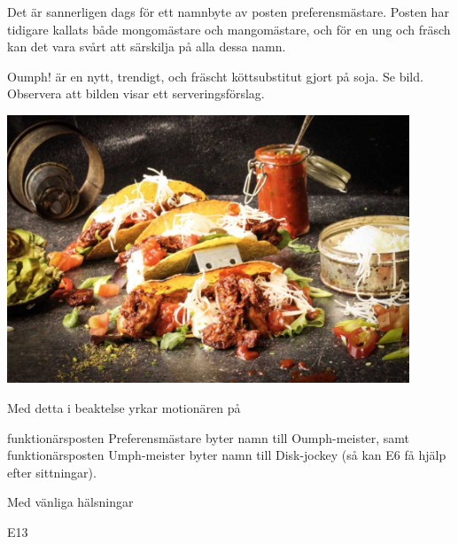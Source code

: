 \documentclass[../_main/handlingar.tex]{subfiles}
\begin{document}
Det är sannerligen dags för ett namnbyte av posten preferensmästare. Posten har tidigare kallats både mongomästare och mangomästare, och för en ung och fräsch kan det vara svårt att särskilja på alla dessa namn.

Oumph! är en nytt, trendigt, och fräscht köttsubstitut gjort på soja. Se bild. Observera att bilden visar ett serveringsförslag.

\begin{center}
\includegraphics[height=8cm]{oumph.jpg}
\end{center}

Med detta i beaktelse yrkar motionären på

\begin{attsatser}
  \att funktionärsposten Preferensmästare byter namn till Oumph-meister, samt
  \att funktionärsposten Umph-meister byter namn till Disk-jockey (så kan E6 få hjälp efter sittningar).
\end{attsatser}

\begin{signatures}{1}
    Med vänliga hälsningar
    \signature{Johannes Koch}{E13}
\end{signatures}
\end{document}
